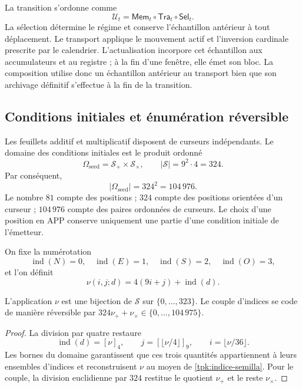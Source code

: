 La transition s'ordonne comme
\begin{equation}
 \mathcal U_t=\mathsf{Mem}_t\circ\mathsf{Tra}_t\circ\mathsf{Sel}_t.
 \label{tpk:composicion}
\end{equation}
La sélection détermine le régime et conserve l'échantillon antérieur à tout déplacement. Le transport applique le mouvement actif et l'inversion cardinale prescrite par le calendrier. L'actualisation incorpore cet échantillon aux accumulateurs et au registre ; à la fin d'une fenêtre, elle émet son bloc. La composition utilise donc un échantillon antérieur au transport bien que son archivage définitif s'effectue à la fin de la transition.

\subsection{Conditions initiales et énumération réversible}
\label{tpk:semillas}

Les feuillets additif et multiplicatif disposent de curseurs indépendants. Le
domaine des conditions initiales est le produit ordonné
\[
 \Omega_{\mathrm{seed}}=\mathcal S_+\times\mathcal S_\times,
 \qquad |\mathcal S|=9^2\cdot4=324.
\]
Par conséquent,
\begin{equation}
 |\Omega_{\mathrm{seed}}|=324^2=104\,976.
 \label{tpk:censo-inicial}
\end{equation}
Le nombre \(81\) compte des positions ; \(324\) compte des positions orientées d'un curseur ; \(104\,976\) compte des paires ordonnées de curseurs. Le choix d'une position en APP conserve uniquement une partie d'une condition initiale de l'émetteur.

On fixe la numérotation
\[
 \operatorname{ind}(N)=0,\quad\operatorname{ind}(E)=1,\quad
 \operatorname{ind}(S)=2,\quad\operatorname{ind}(O)=3,
\]
et l'on définit
\begin{equation}
 \nu(i,j;d)=4(9i+j)+\operatorname{ind}(d).
 \label{tpk:indice-semilla}
\end{equation}

\begin{proposicion}
\label{tpk:enumeracion}
L'application \(\nu\) est une bijection de \(\mathcal S\) sur
\(\{0,\ldots,323\}\). Le couple d'indices se code de manière réversible
par \(324\nu_++\nu_\times\in\{0,\ldots,104\,975\}\).
\end{proposicion}
\begin{proof}
La division par quatre restaure
\[
 \operatorname{ind}(d)=[\nu]_4,\qquad
 j=[\lfloor\nu/4\rfloor]_9,\qquad i=\lfloor\nu/36\rfloor.
\]
Les bornes du domaine garantissent que ces trois quantités appartiennent à
leurs ensembles d'indices et reconstruisent \(\nu\) au moyen de
\eqref{tpk:indice-semilla}. Pour le couple, la division euclidienne par
\(324\) restitue le quotient \(\nu_+\) et le reste \(\nu_\times\).
\end{proof}

